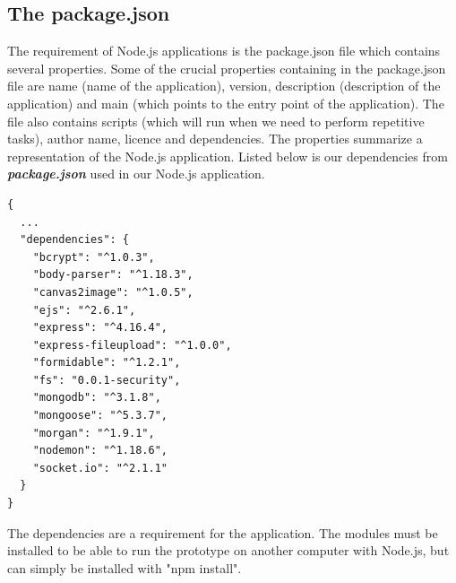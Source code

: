 \subsection{The package.json}
The requirement of Node.js applications is the package.json file which contains several properties. Some of the crucial properties containing in the package.json file are name (name of the application), version, description (description of the application) and main (which points to the entry point of the application). The file also contains scripts (which will run when we need to perform repetitive tasks), author name, licence and dependencies. The properties summarize a representation of the Node.js application. 
\newline \newline
Listed below is our dependencies from \textbf{\textit{package.json}} used in our Node.js application.
\begin{verbatim}
{
  ...
  "dependencies": {
    "bcrypt": "^1.0.3",
    "body-parser": "^1.18.3",
    "canvas2image": "^1.0.5",
    "ejs": "^2.6.1",
    "express": "^4.16.4",
    "express-fileupload": "^1.0.0",
    "formidable": "^1.2.1",
    "fs": "0.0.1-security",
    "mongodb": "^3.1.8",
    "mongoose": "^5.3.7",
    "morgan": "^1.9.1",
    "nodemon": "^1.18.6",
    "socket.io": "^2.1.1"
  }
}
\end{verbatim}
The dependencies are a requirement for the application. The modules must be installed to be able to run the prototype on another computer with Node.js, but can simply be installed with "npm install". 
